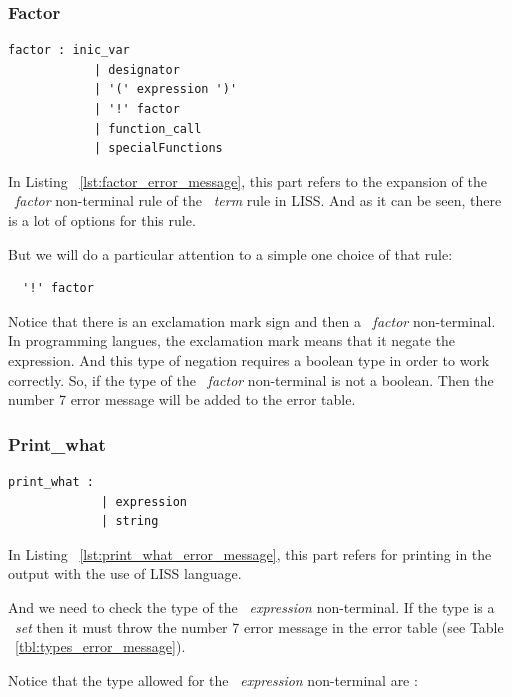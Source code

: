 \documentclass[
  oneside,
  11pt, a4paper,
  footinclude=true,
  headinclude=true,
  cleardoublepage=empty
]{scrbook}
\begin{document}
\subsubsection{Factor}

\begin{lstlisting}[caption={Factor rule in LISS},label={lst:factor_error_message}]
  factor : inic_var
            | designator
            | '(' expression ')'
            | '!' factor
            | function_call
            | specialFunctions
\end{lstlisting}

In Listing ~\ref{lst:factor_error_message}, this part refers to the expansion of the ~\textit{factor} non-terminal rule of the ~\textit{term} rule in LISS.
And as it can be seen, there is a lot of options for this rule.

But we will do a particular attention to a simple one choice of that rule:

\begin{lstlisting}
  '!' factor
\end{lstlisting}

Notice that there is an exclamation mark sign and then a ~\textit{factor} non-terminal. In programming langues, the exclamation mark means that it negate the expression. And this type of negation requires a boolean type in order to work correctly.
So, if the type of the ~\textit{factor} non-terminal is not a boolean. Then the number 7 error message will be added to the error table.

\subsubsection{Print\_what}

\begin{lstlisting}[caption={Print\_what rule in LISS},label={lst:print_what_error_message}]
  print_what : 
             | expression
             | string
\end{lstlisting}

In Listing ~\ref{lst:print_what_error_message}, this part refers for printing in the output with the use of LISS language.

And we need to check the type of the ~\textit{expression} non-terminal. If the type is a ~\textit{set} then it must throw the number 7 error message in the error table (see Table ~\ref{tbl:types_error_message}).

Notice that the type allowed for the ~\textit{expression} non-terminal are :
\end{document}
